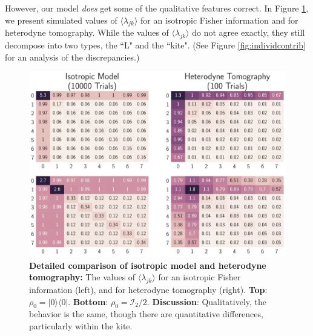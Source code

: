 \documentclass[aps,pra, twocolumn]{revtex4-1}
\begin{document}
However, our model \emph{does} get some of the qualitative features correct. In Figure \ref{fig:model_comparison}, we present simulated values of $\langle \lambda_{jk}\rangle$ for an isotropic Fisher information and for heterodyne tomography. While the values of $\langle \lambda_{jk} \rangle$ do not agree exactly, they still decompose into two types, the ``L" and the ``kite". (See Figure \ref{fig:individcontrib} for an analysis of the discrepancies.)
 
 
\begin{figure}
  \includegraphics[width=\columnwidth]{Images/Figure_13.pdf}
 \caption{\textbf{Detailed comparison of isotropic model and heterodyne tomography:} The values of $\langle \lambda_{jk} \rangle$ for an isotropic Fisher information (left), and for heterodyne tomography (right). \textbf{Top}: $\rho_{0} = |0\rangle\langle 0|$. \textbf{Bottom}: $\rho_{0} = \mathcal{I}_{2}/2$. \textbf{Discussion}: Qualitatively, the behavior is the same, though there are quantitative differences, particularly within the kite.}
\label{fig:model_comparison}
\end{figure}
\end{document}
